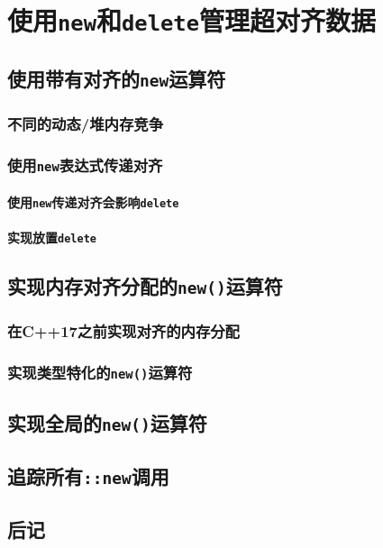 \chapter{使用\texttt{new}和\texttt{delete}管理超对齐数据}\label{ch30}

\section{使用带有对齐的\texttt{new}运算符}

\subsection{不同的动态/堆内存竞争}

\subsection{使用\texttt{new}表达式传递对齐}

\subsubsection{使用\texttt{new}传递对齐会影响\texttt{delete}}
\subsubsection{实现放置\texttt{delete}}\label{ch30.1.2.2}

\section{实现内存对齐分配的\texttt{new()}运算符}
\subsection{在C++17之前实现对齐的内存分配}
\subsection{实现类型特化的\texttt{new()}运算符}\label{ch30.2.2}

\section{实现全局的\texttt{new()}运算符}

\section{追踪所有\texttt{::new}调用}\label{ch30.4}

\section{后记}